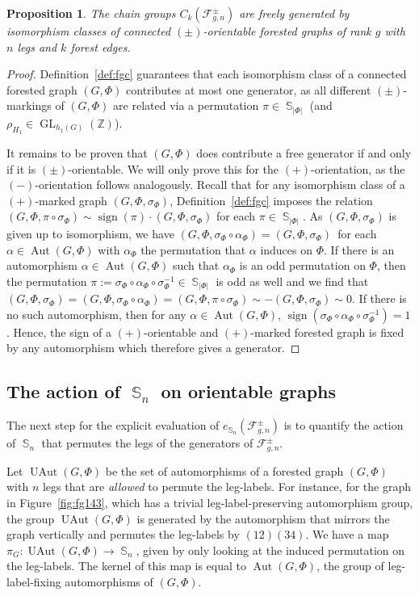 \documentclass[oneside]{amsart}
\newtheorem{proposition}[theorem]{Proposition}
\theoremstyle{remark}
\newcommand{\Z}{\mathbb{Z}}
\DeclareMathOperator{\SG}{{\mathbb S}}
\newcommand{\GL}{{\operatorname{GL}}}
\newcommand{\Aut}{{\operatorname{Aut}}}
\newcommand{\UAut}{{\operatorname{UAut}}}
\newcommand{\sign}{{\operatorname{sign}}}
\newcommand{\F}{\mathcal{F}}
\begin{document}
\begin{proposition}
\label{prop:genorient}
The chain groups $C_k(\F^\pm_{g,n})$ are freely generated by isomorphism classes of connected $(\pm)$-orientable forested graphs of rank $g$ with $n$ legs 
and $k$ forest edges.
\end{proposition}
\begin{proof}
Definition~\ref{def:fgc} guarantees that each isomorphism class of a connected forested graph $(G,\Phi)$ contributes at most one generator, as all different $(\pm)$-markings of $(G,\Phi)$ are related via a permutation $\pi \in \SG_{|\Phi|}$ (and $\rho_{H_1} \in \GL_{h_1(G)}(\Z)$).

It remains to be proven that $(G,\Phi)$ does contribute a free generator if and only if it is $(\pm)$-orientable.  We will only prove this for the $(+)$-orientation, as the $(-)$-orientation follows analogously.
Recall that for any isomorphism class of a $(+)$-marked graph $(G,\Phi,\sigma_\Phi)$, Definition~\ref{def:fgc} imposes the relation $(G,\Phi,\pi \circ \sigma_\Phi) \sim \sign(\pi) \cdot (G,\Phi,\sigma_\Phi)$ for each $\pi \in \SG_{|\Phi|}$.
As $(G,\Phi,\sigma_\Phi)$ is given up to isomorphism, we have $(G,\Phi,\sigma_\Phi \circ \alpha_\Phi) = (G,\Phi,\sigma_\Phi)$ for
each $\alpha \in \Aut(G,\Phi)$ with $\alpha_\Phi$ the permutation that $\alpha$ induces on $\Phi$.
If there is an automorphism $\alpha \in \Aut(G,\Phi)$ such that $\alpha_\Phi$ is 
an odd permutation on $\Phi$, then the permutation $\pi:=\sigma_\Phi \circ \alpha_\Phi \circ \sigma_\Phi^{-1} \in \SG_{|\Phi|}$ is odd as well and we find 
that $ (G,\Phi,\sigma_\Phi)=(G,\Phi,\sigma_\Phi\circ \alpha_\Phi) = (G,\Phi, \pi \circ \sigma_\Phi) \sim - (G,\Phi, \sigma_\Phi)\sim 0$.
If there is no such automorphism, then for any $\alpha\in \Aut(G,\Phi)$,
$\sign (\sigma_\Phi \circ \alpha_\Phi \circ \sigma_\Phi^{-1})=1$. Hence, the sign of a $(+)$-orientable and $(+)$-marked forested graph is fixed by any automorphism which therefore gives a generator.
\end{proof}

\subsection{The action of \texorpdfstring{$\SG_n$}{Sn} on orientable graphs}
The next step for the explicit evaluation of $e_{\SG_n}(\F^\pm_{g,n})$ is to quantify the action of $\SG_n$ 
that permutes the legs
of the generators of $\F^\pm_{g,n}$. %
%

Let $\UAut(G,\Phi)$ be the set of automorphisms of a forested graph $(G,\Phi)$ with $n$ legs that are \emph{allowed} to permute the leg-labels.
For instance, for the graph in Figure~\ref{fig:fg143}, which has a trivial leg-label-preserving automorphism group,
the group $\UAut(G,\Phi)$ is generated by the automorphism that mirrors the graph vertically and permutes the 
leg-labels by $(12)(34)$.
We have a map $\pi_G: \UAut(G,\Phi) \rightarrow \SG_n$, given by only looking at the induced permutation on the leg-labels. The kernel of this map is equal to $\Aut(G,\Phi)$, the group of leg-label-fixing automorphisms of $(G,\Phi)$.
\end{document}
